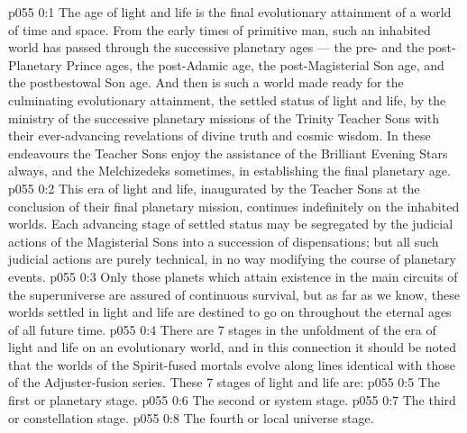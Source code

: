 \author{Mighty Messenger}
\vs p055 0:1 The age of light and life is the final evolutionary attainment of a world of time and space. From the early times of primitive man, such an inhabited world has passed through the successive planetary ages --- the pre\hyp{} and the post\hyp{}Planetary Prince ages, the post\hyp{}Adamic age, the post\hyp{}Magisterial Son age, and the postbestowal Son age. And then is such a world made ready for the culminating evolutionary attainment, the settled status of light and life, by the ministry of the successive planetary missions of the Trinity Teacher Sons with their ever\hyp{}advancing revelations of divine truth and cosmic wisdom. In these endeavours the Teacher Sons enjoy the assistance of the Brilliant Evening Stars always, and the Melchizedeks sometimes, in establishing the final planetary age.
\vs p055 0:2 This era of light and life, inaugurated by the Teacher Sons at the conclusion of their final planetary mission, continues indefinitely on the inhabited worlds. Each advancing stage of settled status may be segregated by the judicial actions of the Magisterial Sons into a succession of dispensations; but all such judicial actions are purely technical, in no way modifying the course of planetary events.
\vs p055 0:3 \pc Only those planets which attain existence in the main circuits of the superuniverse are assured of continuous survival, but as far as we know, these worlds settled in light and life are destined to go on throughout the eternal ages of all future time.
\vs p055 0:4 \pc There are 7 stages in the unfoldment of the era of light and life on an evolutionary world, and in this connection it should be noted that the worlds of the Spirit\hyp{}fused mortals evolve along lines identical with those of the Adjuster\hyp{}fusion series. These 7 stages of light and life are:
\vs p055 0:5 \bibnobreakspace The first or planetary stage.
\vs p055 0:6 \bibnobreakspace The second or system stage.
\vs p055 0:7 \bibnobreakspace The third or constellation stage.
\vs p055 0:8 \bibnobreakspace The fourth or local universe stage.
